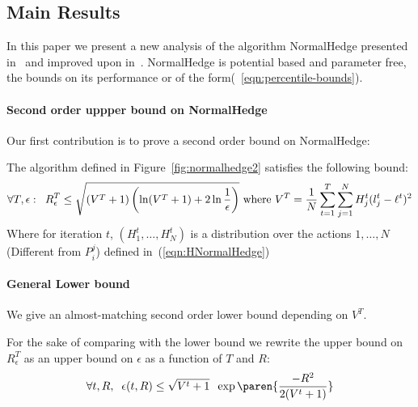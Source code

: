\documentclass{article}[12pt]
\begin{document}
\subsection{Main Results}
In this paper we present a new analysis of the algorithm NormalHedge
presented in~\cite{sec:NormalHedgeAlg} and improved upon
in~\cite{luo2015achieving}.  NormalHedge is potential based and
parameter free, the bounds on its performance or of the
form(~\ref{eqn:percentile-bounds}).

\paragraph*{Second order uppper bound on NormalHedge}
Our first contribution is to prove a second order bound on NormalHedge:
\begin{theorem} \label{thm:NHUpperBound}
The algorithm defined in Figure~\ref{fig:normalhedge2} satisfies the following bound:
\begin{equation} \label{eqn:upper-bound}
\forall T,\epsilon:\;\; R^T_{\epsilon}\leq \sqrt{(V^T+1) \left( \ln (V^T+1) + 2 \ln \frac{1}{\epsilon}\right)}
\mbox{  where  } V^T=\frac{1}{N} \sum_{t=1}^T \sum_{j=1}^N H^t_j (l_j^t-\ell^t)^2
\end{equation}
Where for iteration $t$, $(H_1^t,\ldots, H_N^t)$ is a distribution
over the actions $1,\ldots,N$ (Different from $P_i^j$) defined
in~(\ref{eqn:HNormalHedge})
\end{theorem}

\paragraph*{General Lower bound}
We give an almost-matching second order lower bound depending on $V^T$.

For the sake of comparing with the lower bound we rewrite the upper bound on $R^T_\epsilon$ as an upper
bound on $\epsilon$ as a function of $T$ and $R$:
\begin{equation} \label{eqn:epsilonUpperBound}
  \forall t,R,\;\; \epsilon(t,R) \leq \sqrt{V^t+1} \;\; \exp \paren{\frac{-R^2}{2(V^t+1)}}
\end{equation}
\end{document}
